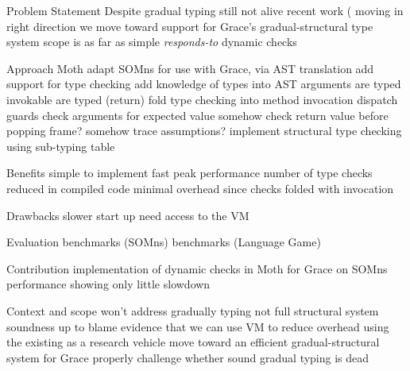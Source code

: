 \begin{outline}

\1 Problem Statement
    \2 Despite 
    \2 gradual typing still not alive
    \2 recent work (\cite{Richards2017,Greenman2017} moving in right direction
    \2 we move toward support for Grace's gradual-structural type system
    \2 scope is as far as simple \emph{responds-to} dynamic checks 

\1 Approach
    \2 Moth
        \3 adapt SOMns for use with Grace, via AST translation
        \3 add support for type checking
    \2 add knowledge of types into AST
        \3 arguments are typed
        \3 invokable are typed (return)
    \2 fold type checking into method invocation
        \3 dispatch guards check arguments for expected value
        \3 somehow check return value before popping frame?
        \3 somehow trace assumptions?
    \2 implement structural type checking using sub-typing table

\1 Benefits
    \2 simple to implement
    \2 fast peak performance
        \3 number of type checks reduced in compiled code
        \3 minimal overhead since checks folded with invocation

\1 Drawbacks
    \2 slower start up
    \2 need access to the VM
    
\1 Evaluation
    \2 benchmarks (SOMns)
    \2 benchmarks (Language Game)

\1 Contribution
    \2 implementation of dynamic checks in Moth for Grace on SOMns
    \2 performance showing only little slowdown

\1 Context and scope
    \2 won't address gradually typing
    \2 not full structural system
    \2 soundness up to blame
    \2 evidence that we can use VM to reduce overhead
    \2 using the existing as a research vehicle
        \3 move toward an efficient gradual-structural system for Grace
        \3 properly challenge whether sound gradual typing is dead

\end{outline}

